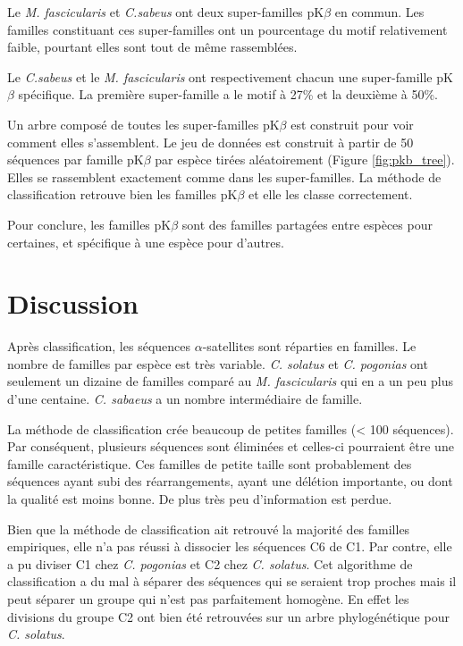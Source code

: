 \documentclass[12pt,a4paper]{article}
\begin{document}
	Le \textit{M. fascicularis} et \textit{C.sabeus} ont deux super-familles pK$\beta$ en commun. Les familles constituant ces super-familles ont un pourcentage du motif relativement faible, pourtant elles sont tout de même rassemblées. 
	
	Le \textit{C.sabeus} et le \textit{M. fascicularis} ont respectivement chacun une super-famille pK$\beta$ spécifique. La première super-famille a le motif à 27\% et la deuxième à 50\%.
		
	Un arbre composé de toutes les super-familles pK$\beta$ est construit pour voir comment elles s'assemblent. Le jeu de données est construit à partir de 50 séquences par famille pK$\beta$ par espèce tirées aléatoirement (Figure \ref{fig:pkb_tree}). Elles se rassemblent exactement comme dans les super-familles. La méthode de classification retrouve bien les familles pK$\beta$ et elle les classe correctement.
	
	Pour conclure, les familles pK$\beta$ sont des familles partagées entre espèces pour certaines, et spécifique à une espèce pour d'autres.

\section{Discussion}

	Après classification, les séquences $\alpha$-satellites sont réparties en familles. Le nombre de familles par espèce est très variable. \textit{C. solatus} et \textit{C. pogonias} ont seulement un dizaine de familles comparé au \textit{M. fascicularis} qui en a un peu plus d'une centaine. \textit{C. sabaeus} a un nombre intermédiaire de famille.

	La méthode de classification crée beaucoup de petites familles (< 100 séquences). Par conséquent, plusieurs séquences sont éliminées et celles-ci pourraient être  une famille caractéristique. Ces familles de petite taille sont probablement des séquences ayant subi des réarrangements, ayant une délétion importante, ou dont la qualité est moins bonne. De plus très peu d'information est perdue.

	Bien que la méthode de classification ait retrouvé la majorité des familles empiriques, elle n'a pas réussi à dissocier les séquences C6 de C1. Par contre, elle a pu diviser C1 chez \textit{C. pogonias} et C2  chez \textit{C. solatus}. Cet algorithme de classification a du mal à séparer des séquences qui se seraient trop proches mais il peut séparer un groupe qui n'est pas parfaitement homogène. En effet les divisions du groupe C2 ont bien été retrouvées sur un arbre phylogénétique pour \textit{C. solatus}.
\end{document}
